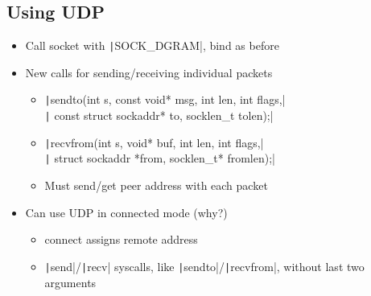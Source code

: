 {\subsection{Using UDP}
\begin{itemize}[nosep]
    \item Call socket with \texttt|SOCK_DGRAM|, bind as before
    \item New calls for sending/receiving individual packets
          \begin{itemize}[nosep]
              \item \texttt|sendto(int s, const void* msg, int len, int flags,|\\
                    \texttt|       const struct sockaddr* to, socklen_t tolen);|
              \item \texttt|recvfrom(int s, void* buf, int len, int flags,|\\
                    \texttt|        struct sockaddr *from, socklen_t* fromlen);|
              \item Must send/get peer address with each packet
          \end{itemize}
    \item Can use UDP in connected mode (why?)
          \begin{itemize}[nosep]
              \item connect assigns remote address
              \item \texttt|send|/\texttt|recv| syscalls, like \texttt|sendto|/\texttt|recvfrom|, without last two arguments
          \end{itemize}
\end{itemize}
}
